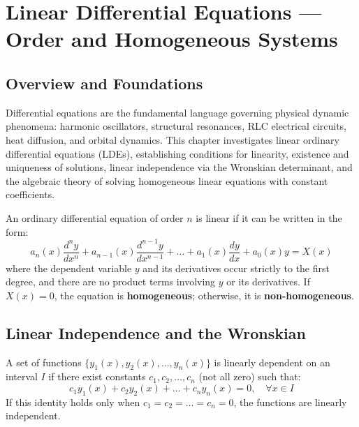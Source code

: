 \chapter{Linear Differential Equations --- Order and Homogeneous Systems}
\label{chap:lde-1}

\section{Overview and Foundations}
Differential equations are the fundamental language governing physical dynamic phenomena: harmonic oscillators, structural resonances, RLC electrical circuits, heat diffusion, and orbital dynamics. This chapter investigates linear ordinary differential equations (LDEs), establishing conditions for linearity, existence and uniqueness of solutions, linear independence via the Wronskian determinant, and the algebraic theory of solving homogeneous linear equations with constant coefficients.

\begin{definition}
An ordinary differential equation of order $n$ is linear if it can be written in the form:
\begin{equation}
a_n(x) \frac{d^n y}{dx^n} + a_{n-1}(x) \frac{d^{n-1} y}{dx^{n-1}} + \dots + a_1(x) \frac{dy}{dx} + a_0(x)y = X(x)
\end{equation}
where the dependent variable $y$ and its derivatives occur strictly to the first degree, and there are no product terms involving $y$ or its derivatives. If $X(x) = 0$, the equation is \textbf{homogeneous}; otherwise, it is \textbf{non-homogeneous}.
\end{definition}

\section{Linear Independence and the Wronskian}
\begin{definition}
A set of functions $\{y_1(x), y_2(x), \dots, y_n(x)\}$ is linearly dependent on an interval $I$ if there exist constants $c_1, c_2, \dots, c_n$ (not all zero) such that:
\begin{equation}
c_1 y_1(x) + c_2 y_2(x) + \dots + c_n y_n(x) = 0, \quad \forall x \in I
\end{equation}
If this identity holds only when $c_1 = c_2 = \dots = c_n = 0$, the functions are linearly independent.
\end{definition}

